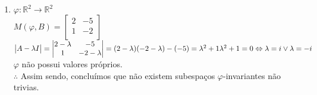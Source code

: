 \documentclass[a4paper, twoside,11pt]{report}
\begin{document}
\begin{enumerate}
\item  $\varphi\colon  	\mathbb{R}^2 \to  \mathbb{R}^2$
\\    $M(\varphi, B)= \begin{bmatrix}
             2 & -5\\
             1 & -2\\
           \end{bmatrix}$
\\    $\begin{vmatrix}
        A - \lambda I\\
        \end{vmatrix} = \begin{vmatrix}
                        2-\lambda & -5\\
                        1 & -2-\lambda \\
                        \end{vmatrix} = (2-\lambda)(-2-\lambda)-(-5) =\lambda^2 +1
                        \\ \lambda^2 +1 =0 \Leftrightarrow \lambda = i \vee \lambda = -i$
                        \\$ \varphi$ não possui valores próprios.
\\ $\therefore$ Assim sendo, concluímos que não existem subespaços $\varphi$-invariantes não trivias.

\vskip 0.25in


\end{enumerate}
\end{document}
